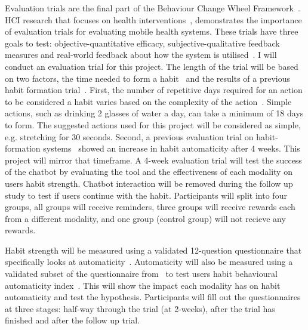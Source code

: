 Evaluation trials are the final part of the Behaviour Change Wheel Framework~\cite{article_behaviour_change_wheel}.
HCI research that focuses on health interventions~\cite{article_mhealth}, demonstrates the importance of evaluation trials for evaluating mobile health systems.
These trials have three goals to test: objective-quantitative efficacy, subjective-qualitative feedback measures and real-world feedback about how the system is
utilised~\cite{article_evaluate_tech_health_behaviour_change}. I will conduct an evaluation trial for this project.\newline
\newline
The length of the trial will be based on two factors, the time needed to form a habit~\cite{article_how_habits_formed_modelling_habit_formation} and the results of a previous
habit formation trial~\cite{article_beyond_self_tracking_designing_apps}.
First, the number of repetitive days required for an action to be considered a habit varies based on the complexity of the action~\cite{article_how_habits_formed_modelling_habit_formation}.
Simple actions, such as drinking 2 glasses of water a day, can take a minimum of 18 days to form.
The suggested actions used for this project will be considered as simple, e.g. stretching for 30 seconds.
Second, a previous evaluation trial on habit-formation systems~\cite{article_how_habits_formed_modelling_habit_formation} showed an increase in habit automaticity after 4 weeks.
This project will mirror that timeframe.\newline
\newline
A 4-week evaluation trial will test the success of the chatbot by evaluating the tool and the effectiveness of each modality on users habit strength.
Chatbot interaction will be removed during the follow up study to test if users continue with the habit.
Participants will split into four groups, all groups will receive reminders, three groups will receive rewards each from a different modality,
and one group (control group) will not recieve any rewards.

Habit strength will be measured using a validated 12-question questionnaire that specifically looks at automaticity~\cite{article_habit_strength}.
Automaticity will also be measured using a validated subset of the questionnaire from~\cite{article_habit_strength} to test users habit behavioural
automaticity index~\cite{article_4q_SRBAI}. This will show the impact each modality has on habit automaticity and test the hypothesis.
Participants will fill out the questionnaires~\cite{article_habit_strength, article_4q_SRBAI} at three stages: half-way through the trial (at 2-weeks),
after the trial has finished and after the follow up trial.


